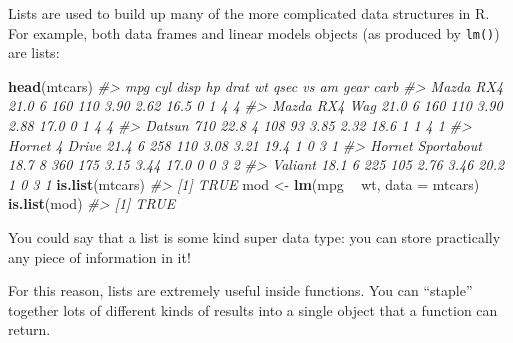 \documentclass[]{book}
\newenvironment{Shaded}{\begin{snugshade}}{\end{snugshade}}
\newcommand{\KeywordTok}[1]{\textcolor[rgb]{0.13,0.29,0.53}{\textbf{#1}}}
\newcommand{\DataTypeTok}[1]{\textcolor[rgb]{0.13,0.29,0.53}{#1}}
\newcommand{\StringTok}[1]{\textcolor[rgb]{0.31,0.60,0.02}{#1}}
\newcommand{\CommentTok}[1]{\textcolor[rgb]{0.56,0.35,0.01}{\textit{#1}}}
\newcommand{\OperatorTok}[1]{\textcolor[rgb]{0.81,0.36,0.00}{\textbf{#1}}}
\newcommand{\NormalTok}[1]{#1}
\begin{document}
Lists are used to build up many of the more complicated data structures
in R. For example, both data frames and linear models objects (as
produced by \texttt{lm()}) are lists:

\begin{Shaded}
\begin{Highlighting}[]
\KeywordTok{head}\NormalTok{(mtcars)}
\CommentTok{#>                    mpg cyl disp  hp drat   wt qsec vs am gear carb}
\CommentTok{#> Mazda RX4         21.0   6  160 110 3.90 2.62 16.5  0  1    4    4}
\CommentTok{#> Mazda RX4 Wag     21.0   6  160 110 3.90 2.88 17.0  0  1    4    4}
\CommentTok{#> Datsun 710        22.8   4  108  93 3.85 2.32 18.6  1  1    4    1}
\CommentTok{#> Hornet 4 Drive    21.4   6  258 110 3.08 3.21 19.4  1  0    3    1}
\CommentTok{#> Hornet Sportabout 18.7   8  360 175 3.15 3.44 17.0  0  0    3    2}
\CommentTok{#> Valiant           18.1   6  225 105 2.76 3.46 20.2  1  0    3    1}
\KeywordTok{is.list}\NormalTok{(mtcars)}
\CommentTok{#> [1] TRUE}
\NormalTok{mod <-}\StringTok{ }\KeywordTok{lm}\NormalTok{(mpg }\OperatorTok{~}\StringTok{ }\NormalTok{wt, }\DataTypeTok{data =}\NormalTok{ mtcars)}
\KeywordTok{is.list}\NormalTok{(mod)}
\CommentTok{#> [1] TRUE}
\end{Highlighting}
\end{Shaded}

You could say that a list is some kind super data type: you can store
practically any piece of information in it!

For this reason, lists are extremely useful inside functions. You can
``staple'' together lots of different kinds of results into a single
object that a function can return.
\end{document}
